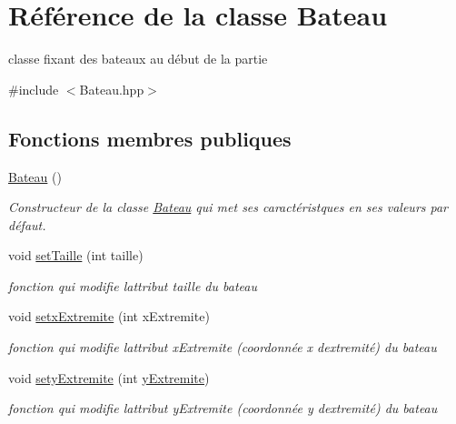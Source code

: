 \hypertarget{class_bateau}{}\section{Référence de la classe Bateau}
\label{class_bateau}


classe fixant des bateaux au début de la partie  




{\ttfamily \#include $<$Bateau.\+hpp$>$}

\subsection*{Fonctions membres publiques}
\begin{DoxyCompactItemize}
\item 
\mbox{\label{class_bateau_af46de2e08abe6b61e218b6cbdc595bfb}} 
\mbox{\hyperlink{class_bateau_af46de2e08abe6b61e218b6cbdc595bfb}{Bateau}} ()
\begin{DoxyCompactList}\small\item\em Constructeur de la classe \mbox{\hyperlink{class_bateau}{Bateau}} qui met ses caractéristques en ses valeurs par défaut. \end{DoxyCompactList}\item 
void \mbox{\hyperlink{class_bateau_ac06303b2d1c9b2c9d6b29e6f65eaff26}{set\+Taille}} (int taille)
\begin{DoxyCompactList}\small\item\em fonction qui modifie l\textquotesingle{}attribut taille du bateau \end{DoxyCompactList}\item 
void \mbox{\hyperlink{class_bateau_aecf45729913eb0c51a82475b996273ce}{setx\+Extremite}} (int x\+Extremite)
\begin{DoxyCompactList}\small\item\em fonction qui modifie l\textquotesingle{}attribut x\+Extremite (coordonnée x d\textquotesingle{}extremité) du bateau \end{DoxyCompactList}\item 
void \mbox{\hyperlink{class_bateau_a7fa9258d53309fcf41de04199d702fe7}{sety\+Extremite}} (int \mbox{\hyperlink{class_bateau_a32294182fa76970d9be2c4de5d8329e6}{y\+Extremite}})
\begin{DoxyCompactList}\small\item\em fonction qui modifie l\textquotesingle{}attribut y\+Extremite (coordonnée y d\textquotesingle{}extremité) du bateau \end{DoxyCompactList}\item 

\end{DoxyCompactItemize}
